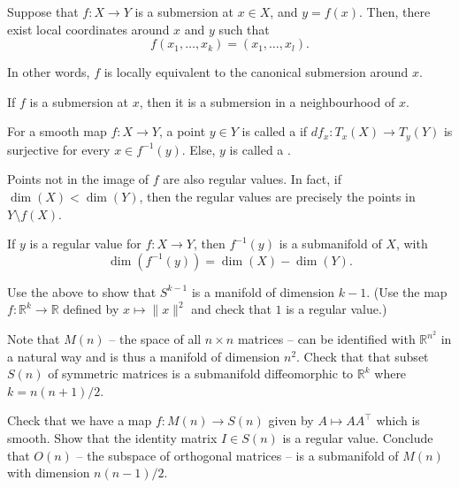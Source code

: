 \begin{thm}
	Suppose that $f : X \to Y$ is a submersion at $x \in X$, and $y = f(x)$. Then, there exist local coordinates around $x$ and $y$ such that
	\begin{equation*} 
		f(x_{1}, \ldots, x_{k}) = (x_{1}, \ldots, x_{l}).
	\end{equation*}

	In other words, $f$ is locally equivalent to the canonical submersion around $x$.
\end{thm}

\begin{cor}
	If $f$ is a submersion at $x$, then it is a submersion in a neighbourhood of $x$.
\end{cor}

\begin{defn}
	For a smooth map $f : X \to Y$, a point $y \in Y$ is called a  if $df_{x} : T_{x}(X) \to T_{y}(Y)$ is surjective for every $x \in f^{-1}(y)$. Else, $y$ is called a .
\end{defn}
Points not in the image of $f$ are also regular values. In fact, if $\dim(X) < \dim(Y)$, then the regular values are precisely the points in $Y \setminus f(X)$.

\begin{thm}
	If $y$ is a regular value for $f : X \to Y$, then $f^{-1}(y)$ is a submanifold of $X$, with
	\begin{equation*} 
		\boxed{\dim(f^{-1}(y)) = \dim(X) - \dim(Y).}
	\end{equation*}
\end{thm}

\begin{exe}
	Use the above to show that $S^{k - 1}$ is a manifold of dimension $k - 1$. (Use the map $f : \mathbb{R}^{k} \to \mathbb{R}$ defined by $x \mapsto \|x\|^{2}$ and check that $1$ is a regular value.)
\end{exe}

\begin{exe}
	Note that $M(n)$ -- the space of all $n \times n$ matrices -- can be identified with $\mathbb{R}^{n^{2}}$ in a natural way and is thus a manifold of dimension $n^{2}$. Check that that subset $S(n)$ of symmetric matrices is a submanifold diffeomorphic to $\mathbb{R}^{k}$ where $k = n(n + 1)/2$.

	Check that we have a map $f : M(n) \to S(n)$ given by $A \mapsto AA^{\top}$ which is smooth. Show that the identity matrix $I \in S(n)$ is a regular value. Conclude that $O(n)$ -- the subspace of orthogonal matrices -- is a submanifold of $M(n)$ with dimension $n(n - 1)/2$.
\end{exe}

